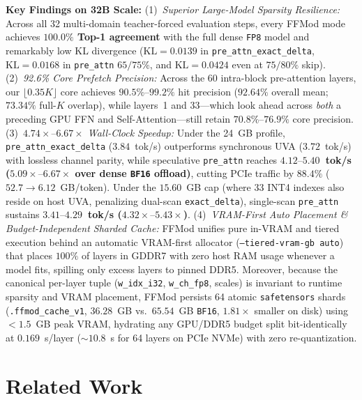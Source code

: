 \documentclass[10pt,twocolumn]{article}
\begin{document}
\textbf{Key Findings on 32B Scale:}
(1)~\emph{Superior Large-Model Sparsity Resilience:} Across all 32 multi-domain teacher-forced evaluation steps, every FFMod mode achieves \textbf{$100.0\%$ Top-1 agreement} with the full dense \texttt{FP8} model and remarkably low KL divergence ($\mathrm{KL}=0.0139$ in \texttt{pre\_attn\_exact\_delta}, $\mathrm{KL}=0.0168$ in \texttt{pre\_attn} $65/75\%$, and $\mathrm{KL}=0.0424$ even at $75/80\%$ skip).
(2)~\emph{92.6\% Core Prefetch Precision:} Across the 60 intra-block pre-attention layers, our $\lfloor 0.35 K\rfloor$ core achieves $90.5\%\text{--}99.2\%$ hit precision ($92.64\%$ overall mean; $73.34\%$ full-$K$ overlap), while layers~1 and 33---which look ahead across \emph{both} a preceding GPU FFN and Self-Attention---still retain $70.8\%\text{--}76.9\%$ core precision.
(3)~\emph{$4.74\times\text{--}6.67\times$ Wall-Clock Speedup:} Under the 24~GB profile, \texttt{pre\_attn\_exact\_delta} ($3.84$~tok/s) outperforms synchronous UVA ($3.72$~tok/s) with lossless channel parity, while speculative \texttt{pre\_attn} reaches \textbf{$4.12\text{--}5.40$~tok/s ($5.09\times\text{--}6.67\times$ over dense \texttt{BF16} offload)}, cutting PCIe traffic by $88.4\%$ ($52.7 \to 6.12$~GB/token). Under the $15.60$~GB cap (where 33 INT4 indexes also reside on host UVA, penalizing dual-scan \texttt{exact\_delta}), single-scan \texttt{pre\_attn} sustains \textbf{$3.41\text{--}4.29$~tok/s ($4.32\times\text{--}5.43\times$)}.
(4)~\emph{VRAM-First Auto Placement \& Budget-Independent Sharded Cache:} FFMod unifies pure in-VRAM and tiered execution behind an automatic VRAM-first allocator (\texttt{--tiered-vram-gb auto}) that places $100\%$ of layers in GDDR7 with zero host RAM usage whenever a model fits, spilling only excess layers to pinned DDR5. Moreover, because the canonical per-layer tuple (\texttt{w\_idx\_i32}, \texttt{w\_ch\_fp8}, scales) is invariant to runtime sparsity and VRAM placement, FFMod persists 64 atomic \texttt{safetensors} shards (\texttt{.ffmod\_cache\_v1}, $36.28$~GB vs.\ $65.54$~GB \texttt{BF16}, $1.81\times$ smaller on disk) using $<1.5$~GB peak VRAM, hydrating any GPU/DDR5 budget split bit-identically at $0.169$~s/layer ($\sim 10.8$~s for 64 layers on PCIe NVMe) with zero re-quantization.

\section{Related Work}
\label{sec:related}
\end{document}
